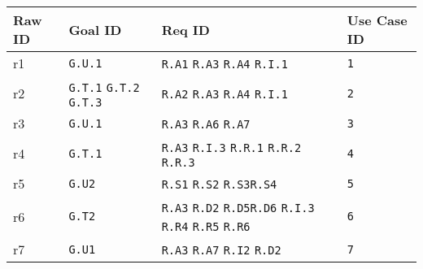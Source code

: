       \begin{table}[h!]
        \centering
        \begin{tabularx}{\linewidth}{|X|X|X|X|}
          \hline
          \textbf{Raw ID} & \textbf{Goal ID} & \textbf{Req ID} & \textbf{Use Case ID} \\
          \hline

	        r1 & \texttt{G.U.1} & \texttt{R.A1}  \newline \texttt{R.A3}  \newline \texttt{R.A4} \newline \texttt{R.I.1}& \texttt{1} \\
          \hline

	        r2 & \texttt{G.T.1}  \newline \texttt{G.T.2} \newline \texttt{G.T.3}& \texttt{R.A2}  \newline \texttt{R.A3}  \newline \texttt{R.A4} \newline \texttt{R.I.1} & \texttt{2} \\
          \hline

	        r3 & \texttt{G.U.1} & \texttt{R.A3}  \newline \texttt{R.A6}  \newline \texttt{R.A7} & \texttt{3}  \\
	         \hline

	        r4 & \texttt{G.T.1} & \texttt{R.A3}  \newline \texttt{R.I.3}  \newline \texttt{R.R.1} \newline \texttt{R.R.2} \newline \texttt{R.R.3}& \texttt{4}  \\
          \hline

          r5 & \texttt{G.U2} & \texttt{R.S1} \newline  \texttt{R.S2} \newline \texttt{R.S3}\newline \texttt{R.S4} & \texttt{5}   \\
          \hline

          r6 & \texttt{G.T2} & \texttt{R.A3} \newline  \texttt{R.D2} \newline \texttt{R.D5}\newline \texttt{R.D6}  \newline \texttt{R.I.3} \newline \texttt{R.R4}  \newline \texttt{R.R5}  \newline \texttt{R.R6} & \texttt{6}   \\
          \hline

          r7 & \texttt{G.U1} & \texttt{R.A3} \newline \texttt{R.A7} \newline  \texttt{R.I2} \newline  \texttt{R.D2} & \texttt{7}   \\
          \hline

      \end{tabularx}
      \end{table}
